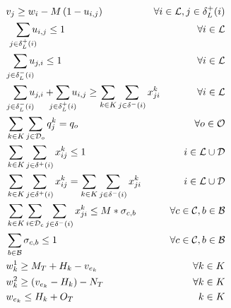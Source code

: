 \documentclass{article}
\begin{document}
\begin{alignat}{3}
    \label{mod:c20} & v_{j} \geq w_{i} - M\left(1- u_{i,j}\right) & \hspace{-20mm}  \forall i \in \mathcal{L}, j \in \delta^{+}_{L}(i) \\
   \label{mod:c21} & \hspace{3mm} \smashoperator{ \sum_{ j \in \delta^{+}_{L}(i)}}{u_{i,j } } \leq 1 & \hspace{-20mm}  \forall i \in \mathcal{L} \\
    \label{mod:c22} & \hspace{2mm} \smashoperator{ \sum_{ j \in \delta^{-}_{L}(i)}}{u_{j,i } } \leq 1 & \hspace{-20mm} \forall i \in \mathcal{L} \\
    \label{mod:c23} & \hspace{2mm} \smashoperator{ \sum_{ j \in \delta^{-}_{L}(i)}}{u_{j,i } } + \smashoperator{ \sum_{ j \in \delta^{+}_{L}(i)}}{u_{i,j } } \geq \sum_{k \in K}\sum_{j \in  \delta^{-}(i) }{x^k_{ji}} & \hspace{-20mm} \forall i \in \mathcal{L} \\
    \label{mod:c24} & \sum_{k \in K}\sum_{j \in \mathcal{D}_o}{q^k_j} = q_o & \hspace{-20mm}  \forall o \in \mathcal{O} \\
    \label{mod:c25} &  \sum_{k \in K}\sum_{j \in \delta^{+}(i)}{x^{k}_{ij} \leq 1} &  i \in \mathcal{L} \cup \mathcal{D} \\
  \label{mod:c26}  &  \sum_{k \in K}\sum_{j \in \delta^{+}(i)} {x^{k}_{ij} } =  \sum_{k \in K}\sum_{j \in \delta^{-}(i)}{x^{k}_{ji} } &  i \in \mathcal{L} \cup \mathcal{D} \\
  \label{mod:c27} & \sum_{k \in K}  \sum_{i \in \mathcal{D}_c} \sum_{j \in \delta^{-}(i) }  {x^k_{ji}} \leq M*\sigma_{c, b} & \forall c \in \mathcal{C}, b \in \mathcal{B} \\
    \label{mod:c28} & \sum_{b \in \mathcal{B}} \sigma_{c, b} \leq 1 & \hspace{-20mm}\forall c \in \mathcal{C}, b \in \mathcal{B} \\
    \label{mod:c29} & w^1_k \geq  M_T + H_k - v_{e_k}  & \hspace{-20mm} \forall k \in K \\
    \label{mod:c30} & w^2_k \geq (v_{e_k} - H_k) - N_T & \hspace{-20mm} \forall k \in K \\
    \label{mod:c31}  & w_{e_k} \leq H_k + O_T  & \hspace{-00mm}  k \in K \hspace{0mm} \\

\end{alignat}
\end{document}
